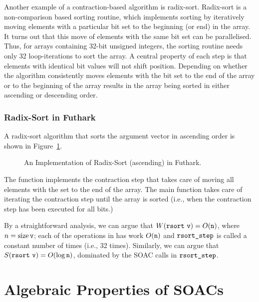 \documentclass[oneside,11pt]{book}
\newcommand{\size}{\ensuremath{\mathrm{size}}}
\renewcommand{\log}{\ensuremath{\mathrm{log}}}
\newenvironment{wrap}{\vspace{\topskip}\par\noindent\begin{minipage}{\linewidth}}{\end{minipage}\par}
\begin{document}
Another example of a contraction-based algorithm is
radix-sort. Radix-sort is a non-comparison based sorting routine,
which implements sorting by iteratively moving elements with a
particular bit set to the beginning (or end) in the array. It turns
out that this move of elements with the same bit set can be
parallelised. Thus, for arrays containing 32-bit unsigned integers,
the sorting routine needs only 32 loop-iterations to sort the array. A
central property of each step is that elements with identical bit
values will not shift position. Depending on whether the algorithm
consistently moves elements with the bit set to the end of the array
or to the beginning of the array results in the array being sorted in
either ascending or descending order.

\subsection{Radix-Sort in Futhark}
\label{sec:radixsort}

A radix-sort algorithm that sorts the argument vector in ascending
order is shown in Figure~\ref{fig:rsort}.

\begin{figure}
\begin{wrap}

\end{wrap}
\caption{An Implementation of Radix-Sort (ascending) in Futhark.}
\label{fig:rsort}
\end{figure}

The function  implements the contraction step that
takes care of moving all elements with the  set to the end
of the array. The main function  takes care of iterating the
contraction step until the array is sorted (i.e., when the contraction
step has been executed for all bits.)

By a straightforward analysis, we can argue that $W(\texttt{rsort}~\texttt{v})
= O(\texttt{n})$, where $n = \size\,\kw{v}$; each of the operations in
 has work $O(\texttt{n})$ and $\texttt{rsort\_step}$ is called
a constant number of times (i.e., 32 times). Similarly, we can argue
that $S(\kw{rsort}~\kw{v}) = O(\log\,\kw{n})$, dominated by the
 SOAC calls in $\texttt{rsort\_step}$.

\chapter{Algebraic Properties of SOACs}
\label{chap:soac-algebra}
\end{document}
